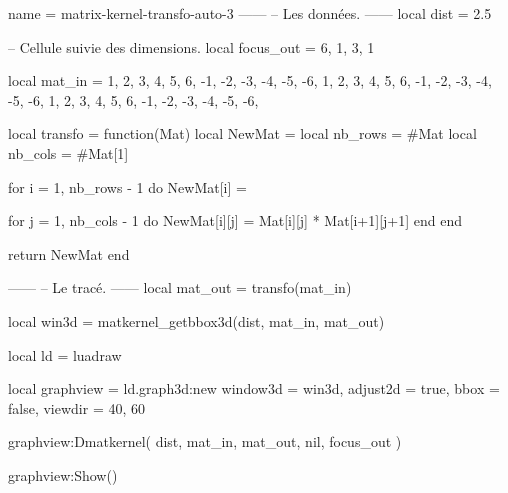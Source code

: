 \documentclass[border = 3pt]{standalone}
\begin{document}
\begin{luadraw*}{name = matrix-kernel-transfo-auto-3}
------
-- Les données.
------
local dist = 2.5

-- Cellule suivie des dimensions.
local focus_out  = { {6, 1}, {3, 1} }

local mat_in = {
  { 1,  2,  3},
  { 4,  5,  6},
  {-1, -2, -3},
  {-4, -5, -6},
  { 1,  2,  3},
  { 4,  5,  6},
  {-1, -2, -3},
  {-4, -5, -6},
  { 1,  2,  3},
  { 4,  5,  6},
  {-1, -2, -3},
  {-4, -5, -6},
}

local transfo = function(Mat)
  local NewMat  = {}
  local nb_rows = #Mat
  local nb_cols = #Mat[1]

  for i = 1, nb_rows - 1 do
    NewMat[i] = {}

    for j = 1, nb_cols - 1 do
      NewMat[i][j] = Mat[i][j] * Mat[i+1][j+1]
    end
  end

  return NewMat
end

------
-- Le tracé.
------
local mat_out = transfo(mat_in)

local win3d = matkernel_getbbox3d(dist, mat_in, mat_out)

local ld = luadraw

local graphview = ld.graph3d:new{
  window3d = win3d,
  adjust2d = true,
  bbox     = false,
  viewdir  = {40, 60}
}

graphview:Dmatkernel(
  dist,
  mat_in, mat_out,
  nil, focus_out
)

graphview:Show()
\end{luadraw*}
\end{document}
